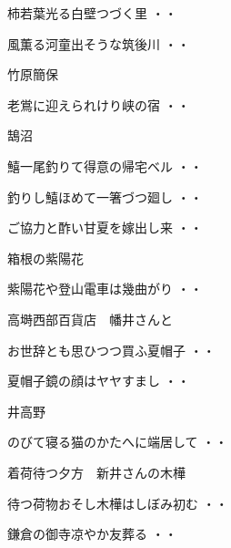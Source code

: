 \begin{shiika}柿若葉光る白壁つづく里
\hfill{・・}\end{shiika}
\begin{shiika}風薫る河童出そうな筑後川
\hfill{・・}\end{shiika}
\vspace{0.6cm}
竹原簡保
\begin{shiika}老鴬に迎えられけり峡の宿
\hfill{・・}\end{shiika}
\vspace{0.6cm}
鵠沼
\begin{shiika}鱚一尾釣りて得意の帰宅ベル
\hfill{・・}\end{shiika}
\begin{shiika}釣りし鱚ほめて一箸づつ廻し
\hfill{・・}\end{shiika}
\begin{shiika}ご協力と酢い甘夏を嫁出し来
\hfill{・・}\end{shiika}
\vspace{0.6cm}
箱根の紫陽花
\begin{shiika}紫陽花や登山電車は幾曲がり
\hfill{・・}\end{shiika}
\vspace{0.6cm}
高塒西部百貨店　幡井さんと
\begin{shiika}お世辞とも思ひつつ買ふ夏帽子
\hfill{・・}\end{shiika}
\begin{shiika}夏帽子鏡の顔はヤヤすまし
\hfill{・・}\end{shiika}
\vspace{0.6cm}
井高野
\begin{shiika}のびて寝る猫のかたへに端居して
\hfill{・・}\end{shiika}
\vspace{0.6cm}
着荷待つ夕方　新井さんの木樺
\begin{shiika}待つ荷物おそし木樺はしぼみ初む
\hfill{・・}\end{shiika}
\vspace{0.6cm}
\begin{shiika}鎌倉の御寺凉やか友葬る
\hfill{・・}\end{shiika}
